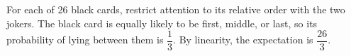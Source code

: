 For each of 26 black cards, restrict attention to its relative order with the two jokers. The black card is equally likely to be first, middle, or last, so its probability of lying between them is $\dfrac{1}{3}$. By linearity, the expectation is $\boxed{\dfrac{26}{3}}$.
